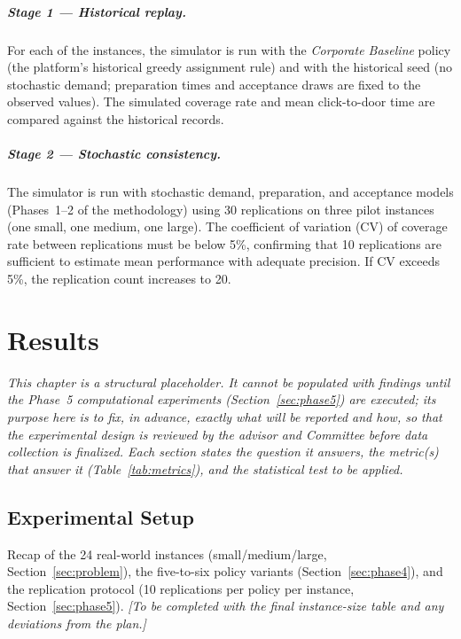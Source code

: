 \documentclass[12pt,a4paper]{report}
\begin{document}
\paragraph{Stage 1 --- Historical replay.}
For each of the instances, the simulator is run with the \emph{Corporate Baseline} policy (the platform's historical greedy assignment rule) and with the historical seed (no stochastic demand; preparation times and acceptance draws are fixed to the observed values). The simulated coverage rate and mean click-to-door time are compared against the historical records.

\paragraph{Stage 2 --- Stochastic consistency.}
The simulator is run with stochastic demand, preparation, and acceptance models
(Phases~1--2 of the methodology) using 30 replications on three pilot instances (one small, one medium, one large). The coefficient of variation (CV) of coverage rate between replications must be below 5\%, confirming that 10 replications are sufficient to estimate mean performance with adequate precision. If CV exceeds 5\%, the replication count increases to 20.


\chapter{Results}
\label{ch:results}

\begingroup\small\noindent\textit{This chapter is a structural placeholder. It cannot be populated with findings until the Phase~5 computational experiments (Section~\ref{sec:phase5}) are executed; its purpose here is to fix, in advance, exactly what will be reported and how, so that the experimental design is reviewed by the advisor and Committee before data collection is finalized. Each section states the question it answers, the metric(s) that answer it (Table~\ref{tab:metrics}), and the statistical test to be applied.}\endgroup

\section{Experimental Setup}
Recap of the 24 real-world instances (small/medium/large, Section~\ref{sec:problem}), the five-to-six policy variants (Section~\ref{sec:phase4}), and the replication protocol (10 replications per policy per instance, Section~\ref{sec:phase5}). \textit{[To be completed with the final instance-size table and any deviations from the plan.]}
\end{document}

